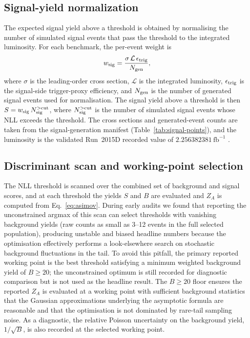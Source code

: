 \documentclass[11pt,a4paper,twocolumn]{article}
\newcommand{\invfb}{\ensuremath{\mathrm{fb}^{-1}}}
\begin{document}
\subsection{Signal-yield normalization}

The expected signal yield above a threshold is obtained by normalising the
number of simulated signal events that pass the threshold to the integrated
luminosity. For each benchmark, the per-event weight is
\begin{equation}
  w_{\rm sig} = \frac{\sigma\, \mathcal{L}\, \epsilon_{\rm trig}}{N_{\rm gen}},
  \label{eq:signal-weight}
\end{equation}
where $\sigma$ is the leading-order cross section, $\mathcal{L}$ is the
integrated luminosity, $\epsilon_{\rm trig}$ is the signal-side trigger-proxy
efficiency, and $N_{\rm gen}$ is the number of generated signal events used
for normalisation. The signal yield above a threshold is then
$S = w_{\rm sig}\, N_{\rm sig}^{>\mathrm{cut}}$, where
$N_{\rm sig}^{>\mathrm{cut}}$ is the number of simulated signal events whose
NLL exceeds the threshold. The cross sections and generated-event counts are
taken from the signal-generation manifest (Table~\ref{tab:signal-points}),
and the luminosity is the validated Run~2015D recorded value of
$2.256382381~\invfb$ \cite{cms_data_policy,cms_lumi_guide}.

\subsection{Discriminant scan and working-point selection}

The NLL threshold is scanned over the combined set of background and signal
scores, and at each threshold the yields $S$ and $B$ are evaluated and
$Z_A$ is computed from Eq.~\eqref{eq:asimov}. During early audits we found
that reporting the unconstrained argmax of this scan can select thresholds
with vanishing background yields (raw counts as small as 3--12 events in the
full selected population), producing unstable and biased headline numbers
because the optimisation effectively performs a look-elsewhere search on
stochastic background fluctuations in the tail. To avoid this pitfall, the
primary reported working point is the best threshold satisfying a minimum
weighted background yield of $B\geq20$; the unconstrained optimum is still
recorded for diagnostic comparison but is not used as the headline result.
The $B\geq20$ floor ensures the reported $Z_A$ is evaluated at a working
point with sufficient background statistics that the Gaussian
approximations underlying the asymptotic formula are reasonable and that
the optimisation is not dominated by rare-tail sampling noise. As a
diagnostic, the relative Poisson uncertainty on the background yield,
$1/\sqrt{B}$, is also recorded at the selected working point.
\end{document}

